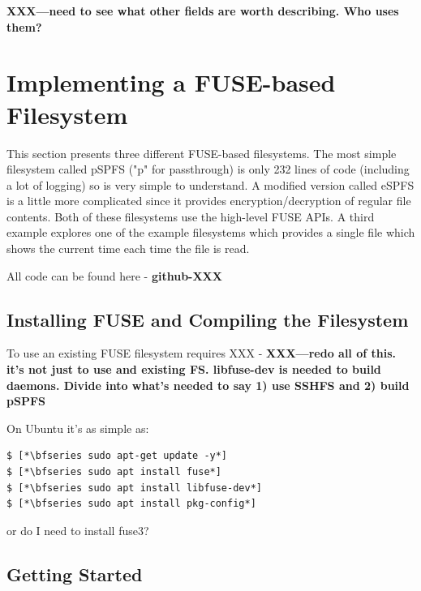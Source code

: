 \textbf{XXX---need to see what other fields are worth describing. Who uses them?}


\section{Implementing a FUSE-based Filesystem}\label{pspfs}

This section presents three different FUSE-based filesystems. The most simple filesystem called pSPFS ("p" for passthrough) is only 232 lines of code (including a lot of logging) so is very simple to understand. A modified version called eSPFS is a little more complicated since it provides encryption/decryption of regular file contents. Both of these filesystems use the high-level FUSE APIs. A third example explores one of the  example filesystems which provides a single file which shows the current time each time the file is read.

All code can be found here - \textbf{github-XXX}


\subsection{Installing FUSE and Compiling the Filesystem}

To use an existing FUSE filesystem requires XXX - \textbf{XXX---redo all of this. it's not just to use and existing FS. libfuse-dev is needed to build daemons. Divide into what's needed to say 1) use SSHFS and 2) build pSPFS}

On Ubuntu it's as simple as:

\begin{lstlisting}
$ [*\bfseries sudo apt-get update -y*]
$ [*\bfseries sudo apt install fuse*]
$ [*\bfseries sudo apt install libfuse-dev*]
$ [*\bfseries sudo apt install pkg-config*]
\end{lstlisting}

\noindent
or do I need to install fuse3?


\subsection{Getting Started}

